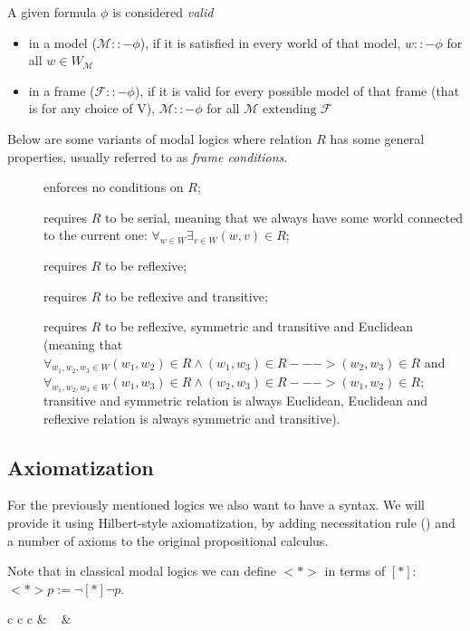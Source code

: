 A given formula $\phi$ is considered \emph{valid}
\begin{itemize}
\item in a model ($\mathcal M ::- \phi$), if it is satisfied in every world of that model, $w ::- \phi$ for all $w \in W_\mathcal{M}$
\item in a frame ($\mathcal F ::- \phi$), if it is valid for every possible model of that frame (that is for any choice of V), $\mathcal M ::- \phi$ for all $\mathcal M \text{ extending } \mathcal F$
\end{itemize}

Below are some variants of modal logics where relation $R$ has some general properties, usually referred to as \emph{frame conditions}.
\begin{description}
\item[\axiomK] enforces no conditions on $R$;
\item[\axiomD] requires $R$ to be serial, meaning that we always have some world connected to the current one: $\forall_{w \in W} \exists_{v \in W} (w, v) \in R$;
\item[\axiomT] requires $R$ to be reflexive;
\item[\axiomSfour] requires $R$ to be reflexive and transitive;
\item[\axiomSfive] requires $R$ to be reflexive, symmetric and transitive and Euclidean (meaning that $\forall_{w_1, w_2, w_3 \in W} (w_1, w_2) \in R \wedge (w_1, w_3) \in R ---> (w_2, w_3) \in R$ and $\forall_{w_1, w_2, w_3 \in W} (w_1, w_3) \in R \wedge (w_2, w_3) \in R ---> (w_1, w_2) \in R$; transitive and symmetric relation is always Euclidean, Euclidean and reflexive relation is always symmetric and transitive).
\end{description}

\subsection{Axiomatization}

For the previously mentioned logics we also want to have a syntax. We will provide it using Hilbert-style axiomatization, by adding necessitation rule () and a number of axioms to the original propositional calculus.

Note that in classical modal logics we can define $<*>$ in terms of $[*]$:\\
 ${<*>p := \neg [*] \neg p}$.

\begin{center}
\begin{tabular} { c c c }
 & ~ &
\end{tabular}
\end{center}

